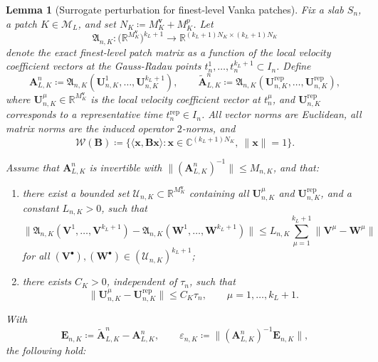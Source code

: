 \documentclass[10pt,a4paper]{amsart}
\newtheorem{lemma}{Lemma}
\newcommand{\Sn}{S_n}
\begin{document}
\begin{lemma}[Surrogate perturbation for finest-level Vanka patches]
\label{lem:patch-surrogate}
Fix a slab $\Sn$, a patch $K\in\mathcal M_L$, and set
$N_K\coloneq M_K^{\boldsymbol v}+M_K^p$. Let
\[
  \mathfrak A_{n,K}:
  \bigl(\mathbb R^{M_K^{\boldsymbol v}}\bigr)^{k_L+1}
  \to
  \mathbb R^{(k_L+1)N_K\times (k_L+1)N_K}
\]
denote the exact finest-level patch matrix as a function of the local velocity
coefficient vectors at the Gauss-Radau points
$t_n^1,\dots,t_n^{k_L+1}\subset I_n$. Define
\[
  \bm A_{L,K}^n
  \coloneq
  \mathfrak A_{n,K}(\bm U_{n,K}^1,\dots,\bm U_{n,K}^{k_L+1}),
  \qquad
  \tilde{\bm A}_{L,K}^n
  \coloneq
  \mathfrak A_{n,K}(\bm U_{n,K}^{\mathrm{rep}},\dots,\bm U_{n,K}^{\mathrm{rep}}),
\]
where $\bm U_{n,K}^\mu\in\mathbb R^{M_K^{\boldsymbol v}}$ is the local velocity
coefficient vector at $t_n^\mu$, and $\bm U_{n,K}^{\mathrm{rep}}$ corresponds
to a representative time $t_n^{\mathrm{rep}}\in I_n$. All vector norms are
Euclidean, all matrix norms are the induced operator \(2\)-norms, and
\[
  \mathcal W(\bm B)
  \coloneq
  \{\langle \bm x,\bm B\bm x\rangle:
  \bm x\in\mathbb C^{(k_L+1)N_K},\ \|\bm x\|=1\}.
\]

Assume that $\bm A_{L,K}^n$ is invertible with
$\|(\bm A_{L,K}^n)^{-1}\|\le M_{n,K}$, and that:

\begin{enumerate}[label=(\roman*),leftmargin=*,itemsep=2pt,topsep=2pt,parsep=0pt]
\item there exist a bounded set
$\mathcal U_{n,K}\subset\mathbb R^{M_K^{\boldsymbol v}}$ containing all
$\bm U_{n,K}^\mu$ and $\bm U_{n,K}^{\mathrm{rep}}$, and a constant $L_{n,K}>0$,
such that
\begin{equation}\label{eq:patch-lipschitz}
  \|\mathfrak A_{n,K}(\bm V^1,\dots,\bm V^{k_L+1})
   -\mathfrak A_{n,K}(\bm W^1,\dots,\bm W^{k_L+1})\|
  \le
  L_{n,K}\sum_{\mu=1}^{k_L+1}\|\bm V^\mu-\bm W^\mu\|
\end{equation}
for all $(\bm V^\bullet),(\bm W^\bullet)\in(\mathcal U_{n,K})^{k_L+1}$;

\item there exists \(C_K>0\), independent of \(\tau_n\), such that
\begin{equation}\label{eq:patch-approx}
  \|\bm U_{n,K}^\mu-\bm U_{n,K}^{\mathrm{rep}}\|
  \le C_K\tau_n,
  \qquad \mu=1,\dots,k_L+1.
\end{equation}
\end{enumerate}

With
\[
  \bm E_{n,K}\coloneq \tilde{\bm A}_{L,K}^n-\bm A_{L,K}^n,
  \qquad
  \varepsilon_{n,K}\coloneq
  \|(\bm A_{L,K}^n)^{-1}\bm E_{n,K}\|,
\]
the following hold:


\end{lemma}
\end{document}
